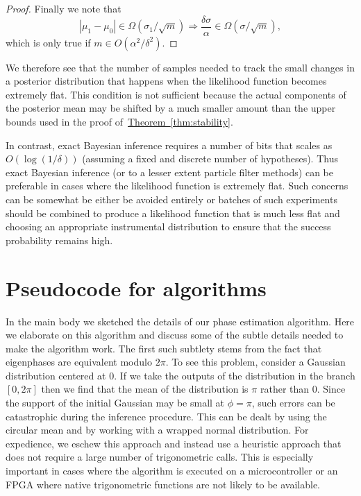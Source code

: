 \documentclass[aps,pra,amsmath,twocolumn,amssymb,superscriptaddress]{revtex4-1}
\newcommand{\thm}[1]{\hyperref[thm:#1]{Theorem~\ref*{thm:#1}}}
\begin{document}
\begin{proof}
Finally we note that
\begin{equation}
|\mu_1-\mu_0| \in \Omega(\sigma_1/\sqrt{m}) \Rightarrow \frac{\delta \sigma}{\alpha} \in \Omega(\sigma/\sqrt{m}),
\end{equation}
which is only true if $m\in O(\alpha^2/\delta^2)$.
\end{proof}
We therefore see that the number of samples needed to track the small changes in a posterior distribution that happens when the likelihood function becomes extremely flat.  This condition is not sufficient because the actual components of the posterior mean may be shifted by a much smaller amount than the upper bounds used in the proof of~\thm{stability}.

In contrast, exact Bayesian inference requires a number of bits that scales as $O(\log(1/\delta))$ (assuming a fixed and discrete number of hypotheses).  Thus exact Bayesian inference (or to a lesser extent particle filter methods) can be preferable in cases where the likelihood function is extremely flat.  Such concerns can be somewhat be either be avoided entirely or batches of such experiments should be combined to produce a likelihood function that is much less flat and choosing an appropriate instrumental distribution to ensure that the success probability remains high.

\section{Pseudocode for algorithms}
In the main body we sketched the details of our phase estimation algorithm.  Here we elaborate on this algorithm and discuss some of the
subtle details needed to make the algorithm work.  The first such subtlety stems from the fact that eigenphases are equivalent modulo $2\pi$.  
To see this problem, consider a Gaussian distribution centered at $0$.  If we take the outputs of the distribution in the branch $[0,2\pi]$ then we find that the mean of the distribution is $\pi$ rather than $0$.  Since the support of the initial Gaussian may be small at $\phi=\pi$, such errors can be catastrophic during the inference procedure.  This can be dealt by using the circular mean and by working with a wrapped normal distribution.  For expedience, we eschew this approach and instead use a heuristic approach that does  not require a large number of trigonometric calls.  This is especially important in cases where the algorithm is executed on a microcontroller or an FPGA where native trigonometric functions are not likely to be available.
\end{document}
